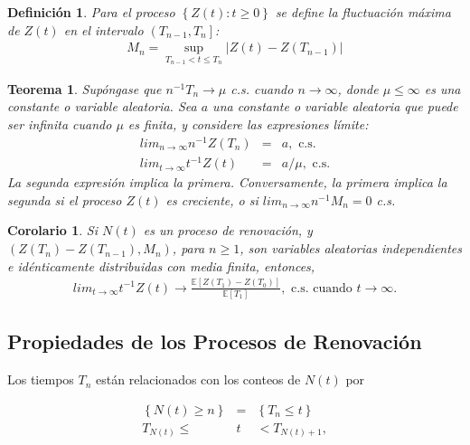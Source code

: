 \documentclass{article}
\newtheorem{Def}{Definición}
\newtheorem{Teo}{Teorema}
\newtheorem{Coro}{Corolario}
\newcommand{\esp}{\mathbb{E}}
\begin{document}
\begin{Def}
Para el proceso $\left\{Z\left(t\right):t\geq0\right\}$ se define la fluctuaci\'on m\'axima de $Z\left(t\right)$ en el intervalo $\left(T_{n-1},T_{n}\right]$:
\begin{eqnarray*}
M_{n}=\sup_{T_{n-1}<t\leq T_{n}}|Z\left(t\right)-Z\left(T_{n-1}\right)|
\end{eqnarray*}
\end{Def}

\begin{Teo}
Sup\'ongase que $n^{-1}T_{n}\rightarrow\mu$ c.s. cuando $n\rightarrow\infty$, donde $\mu\leq\infty$ es una constante o variable aleatoria. Sea $a$ una constante o variable aleatoria que puede ser infinita cuando $\mu$ es finita, y considere las expresiones l\'imite:
\begin{eqnarray}
lim_{n\rightarrow\infty}n^{-1}Z\left(T_{n}\right)&=&a,\textrm{ c.s.}\\
lim_{t\rightarrow\infty}t^{-1}Z\left(t\right)&=&a/\mu,\textrm{ c.s.}
\end{eqnarray}
La segunda expresi\'on implica la primera. Conversamente, la primera implica la segunda si el proceso $Z\left(t\right)$ es creciente, o si $lim_{n\rightarrow\infty}n^{-1}M_{n}=0$ c.s.
\end{Teo}

\begin{Coro}
Si $N\left(t\right)$ es un proceso de renovaci\'on, y $\left(Z\left(T_{n}\right)-Z\left(T_{n-1}\right),M_{n}\right)$, para $n\geq1$, son variables aleatorias independientes e id\'enticamente distribuidas con media finita, entonces,
\begin{eqnarray}
lim_{t\rightarrow\infty}t^{-1}Z\left(t\right)\rightarrow\frac{\esp\left[Z\left(T_{1}\right)-Z\left(T_{0}\right)\right]}{\esp\left[T_{1}\right]},\textrm{ c.s. cuando  }t\rightarrow\infty.
\end{eqnarray}
\end{Coro}
%
\subsection{Propiedades de los Procesos de Renovaci\'on}
%

Los tiempos $T_{n}$ est\'an relacionados con los conteos de $N\left(t\right)$ por

\begin{eqnarray*}
\left\{N\left(t\right)\geq n\right\}&=&\left\{T_{n}\leq t\right\}\\
T_{N\left(t\right)}\leq &t&<T_{N\left(t\right)+1},
\end{eqnarray*}
\end{document}
